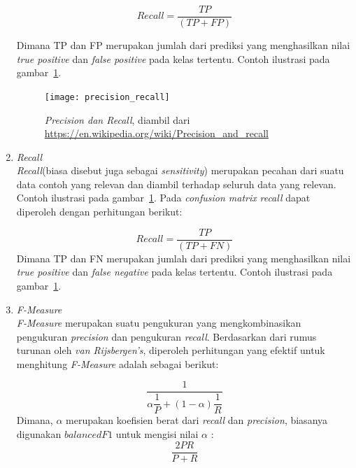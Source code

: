 \begin{enumerate}
	 \begin{equation}
	 	Recall = \dfrac{TP}{(TP + FP)}
	 \end{equation}
	 
	 Dimana TP dan FP merupakan jumlah dari prediksi yang menghasilkan nilai \textit{true positive} dan \textit{false positive} pada kelas tertentu. Contoh ilustrasi pada gambar~\ref{fig:precision_recall}. 
	 
	\begin{figure}[H]
	\centering
	\texttt{[image: precision\_recall]}
	\caption[\textit{Precision dan Recall}, diambil dari \url{https://en.wikipedia.org/wiki/Precision_and_recall}]{\textit{Precision dan Recall}, diambil dari \url{https://en.wikipedia.org/wiki/Precision_and_recall}}
	\label{fig:precision_recall}
\end{figure}

	 \item \textit{Recall}\\
	 \textit{Recall}(biasa disebut juga sebagai \textit{sensitivity}) merupakan pecahan dari suatu data contoh yang relevan dan diambil terhadap seluruh data yang relevan. Contoh ilustrasi pada gambar~\ref{fig:precision_recall}. Pada \textit{confusion matrix} \textit{recall} dapat diperoleh dengan perhitungan berikut:

	 \begin{equation}
	 	Recall = \dfrac{TP}{(TP + FN)}
	 \end{equation}
	Dimana TP dan FN merupakan jumlah dari prediksi yang menghasilkan nilai \textit{true positive} dan \textit{false negative} pada kelas tertentu. Contoh ilustrasi pada gambar~\ref{fig:precision_recall}. 	 
	 
	 \item \textit{F-Measure}\\
	  \textit{F-Measure} merupakan suatu pengukuran yang mengkombinasikan pengukuran \textit{precision} dan pengukuran \textit{recall}. Berdasarkan dari rumus turunan oleh \textit{van Rijsbergen's}, diperoleh perhitungan yang efektif untuk menghitung \textit{F-Measure} adalah sebagai berikut:
	 
	 \begin{equation}
	 	\dfrac{1}{\alpha \dfrac{1}{P} + (1 - \alpha)\dfrac{1}{R}}
	 \end{equation}
	 Dimana, $\alpha$ merupakan koefisien berat dari \textit{recall} dan \textit{precision}, biasanya digunakan $balanced F1$ untuk mengisi nilai $\alpha$ :
	 \begin{equation}
	 	\dfrac{2PR}{P + R}
	 \end{equation}

\end{enumerate}


